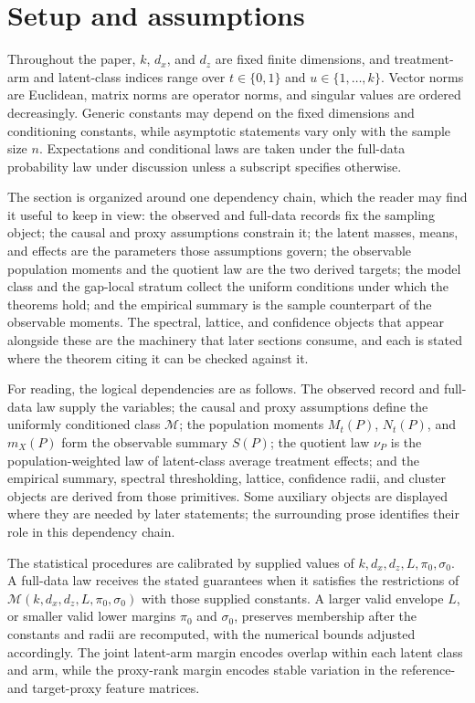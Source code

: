 \section{Setup and assumptions}

Throughout the paper, \(k\), \(d_x\), and \(d_z\) are fixed finite dimensions, and treatment-arm and latent-class indices range over \(t\in\{0,1\}\) and \(u\in\{1,\ldots,k\}\). Vector norms are Euclidean, matrix norms are operator norms, and singular values are ordered decreasingly. Generic constants may depend on the fixed dimensions and conditioning constants, while asymptotic statements vary only with the sample size \(n\). Expectations and conditional laws are taken under the full-data probability law under discussion unless a subscript specifies otherwise.

The section is organized around one dependency chain, which the reader may find it useful to keep in view: the observed and full-data records fix the sampling object; the causal and proxy assumptions constrain it; the latent masses, means, and effects are the parameters those assumptions govern; the observable population moments and the quotient law are the two derived targets; the model class and the gap-local stratum collect the uniform conditions under which the theorems hold; and the empirical summary is the sample counterpart of the observable moments. The spectral, lattice, and confidence objects that appear alongside these are the machinery that later sections consume, and each is stated where the theorem citing it can be checked against it.

For reading, the logical dependencies are as follows. The observed record and full-data law supply the variables; the causal and proxy assumptions define the uniformly conditioned class \(\mathcal M\); the population moments \(M_t(P)\), \(N_t(P)\), and \(m_X(P)\) form the observable summary \(S(P)\); the quotient law \(\nu_P\) is the population-weighted law of latent-class average treatment effects; and the empirical summary, spectral thresholding, lattice, confidence radii, and cluster objects are derived from those primitives. Some auxiliary objects are displayed where they are needed by later statements; the surrounding prose identifies their role in this dependency chain.

The statistical procedures are calibrated by supplied values of \(k,d_x,d_z,L,\pi_0,\sigma_0\). A full-data law receives the stated guarantees when it satisfies the restrictions of \(\mathcal M(k,d_x,d_z,L,\pi_0,\sigma_0)\) with those supplied constants. A larger valid envelope \(L\), or smaller valid lower margins \(\pi_0\) and \(\sigma_0\), preserves membership after the constants and radii are recomputed, with the numerical bounds adjusted accordingly. The joint latent-arm margin encodes overlap within each latent class and arm, while the proxy-rank margin encodes stable variation in the reference- and target-proxy feature matrices.

